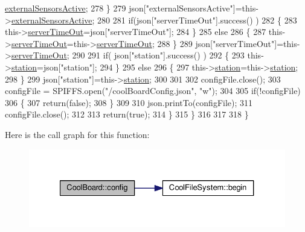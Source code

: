 \begin{DoxyCode}
      \hyperlink{classCoolBoard_af29860cc422622dc33614f9eabb58c40}{externalSensorsActive};
278             \}
279             json[\textcolor{stringliteral}{"externalSensorsActive"}]=this->\hyperlink{classCoolBoard_af29860cc422622dc33614f9eabb58c40}{externalSensorsActive};
280             
281             \textcolor{keywordflow}{if}(json[\textcolor{stringliteral}{"serverTimeOut"}].success() )
282             \{           
283                 this->\hyperlink{classCoolBoard_a7a8d8d3d316220cdd049cd63c1aa8fe6}{serverTimeOut}=json[\textcolor{stringliteral}{"serverTimeOut"}];
284             \}
285             \textcolor{keywordflow}{else}
286             \{
287                 this->\hyperlink{classCoolBoard_a7a8d8d3d316220cdd049cd63c1aa8fe6}{serverTimeOut}=this->\hyperlink{classCoolBoard_a7a8d8d3d316220cdd049cd63c1aa8fe6}{serverTimeOut};
288             \}
289             json[\textcolor{stringliteral}{"serverTimeOut"}]=this->\hyperlink{classCoolBoard_a7a8d8d3d316220cdd049cd63c1aa8fe6}{serverTimeOut};
290             
291             \textcolor{keywordflow}{if}( json[\textcolor{stringliteral}{"station"}].success() )
292             \{
293                 this->\hyperlink{classCoolBoard_a164c550df8424e32fe90bce460c7becf}{station}=json[\textcolor{stringliteral}{"station"}];           
294             \}
295             \textcolor{keywordflow}{else}
296             \{
297                 this->\hyperlink{classCoolBoard_a164c550df8424e32fe90bce460c7becf}{station}=this->\hyperlink{classCoolBoard_a164c550df8424e32fe90bce460c7becf}{station};          
298             \}
299             json[\textcolor{stringliteral}{"station"}]=this->\hyperlink{classCoolBoard_a164c550df8424e32fe90bce460c7becf}{station};           
300             
301             
302             configFile.close();
303             configFile = SPIFFS.open(\textcolor{stringliteral}{"/coolBoardConfig.json"}, \textcolor{stringliteral}{"w"});
304         
305             \textcolor{keywordflow}{if}(!configFile)
306             \{
307                 \textcolor{keywordflow}{return}(\textcolor{keyword}{false});
308             \}
309 
310             json.printTo(configFile);
311             configFile.close();
312     
313             \textcolor{keywordflow}{return}(\textcolor{keyword}{true}); 
314         \}
315     \}   
316     
317 
318 \}
\end{DoxyCode}
Here is the call graph for this function\+:
\nopagebreak
\begin{figure}[H]
\begin{center}
\leavevmode
\includegraphics[width=327pt]{classCoolBoard_a583a874c09c07e70a6eb9229fc4beddb_cgraph}
\end{center}
\end{figure}

